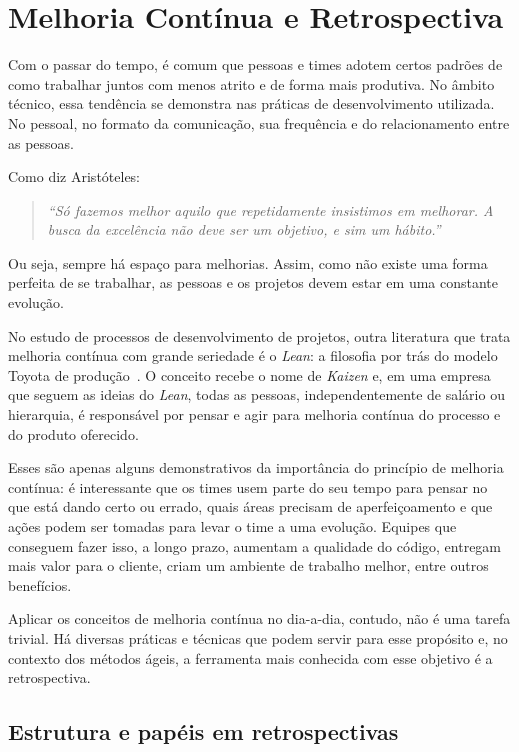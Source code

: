 \section{Melhoria Contínua e Retrospectiva}

Com o passar do tempo, é comum que pessoas e times adotem certos padrões de como trabalhar juntos com menos atrito e de forma mais produtiva. No âmbito técnico, essa tendência se demonstra nas práticas de desenvolvimento utilizada. No pessoal, no formato da comunicação, sua frequência e do relacionamento entre as pessoas.

Como diz Aristóteles: 

\begin{quote}
\textit{``Só fazemos melhor aquilo que repetidamente insistimos em melhorar. A busca da excelência não deve ser um objetivo, e sim um hábito.''}
\end{quote}

Ou seja, sempre há espaço para melhorias. Assim, como não existe uma forma perfeita de se trabalhar, as pessoas e os projetos devem estar em uma constante evolução.

No estudo de processos de desenvolvimento de projetos, outra literatura que trata melhoria contínua com grande seriedade é o \textit{Lean}: a filosofia por trás do modelo Toyota de produção~\cite{lean}. O conceito recebe o nome de \textit{Kaizen} e, em uma empresa que seguem as ideias do \textit{Lean}, todas as pessoas, independentemente de salário ou hierarquia, é responsável por pensar e agir para melhoria contínua do processo e do produto oferecido.

Esses são apenas alguns demonstrativos da importância do princípio de melhoria contínua: é interessante que os times usem parte do seu tempo para pensar no que está dando certo ou errado, quais áreas precisam de aperfeiçoamento e que ações podem ser tomadas para levar o time a uma evolução. Equipes que conseguem fazer isso, a longo prazo, aumentam a qualidade do código, entregam mais valor para o cliente, criam um ambiente de trabalho melhor, entre outros benefícios.

Aplicar os conceitos de melhoria contínua no dia-a-dia, contudo, não é uma tarefa trivial. Há diversas práticas e técnicas que podem servir para esse propósito e, no contexto dos métodos ágeis, a ferramenta mais conhecida com esse objetivo é a retrospectiva.

\subsection{Estrutura e papéis em retrospectivas}

